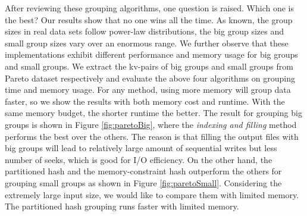After reviewing these grouping algorithms, one question is raised. Which one is the best? Our results show that no one wins all the time. As known, the group sizes in real data sets follow power-law distributions, the big group sizes and small group sizes vary over an enormous range. We further observe that these implementations exhibit different performance and memory usage for big groups and small groups. We extract the kv-pairs of big groups and small groups from Pareto dataset respectively and evaluate the above four algorithms on grouping time and memory usage. For any method, using more memory will group data faster, so we show the results with both memory cost and runtime. With the same memory budget, the shorter runtime the better. The result for grouping big groups is shown in Figure \ref{fig:paretoBig}, where the \emph{indexing and filling} method performs the best over the others. The reason is that filling the output files with big groups will lead to relatively large amount of sequential writes but less number of seeks, which is good for I/O efficiency. On the other hand, the partitioned hash and the memory-constraint hash outperform the others for grouping small groups as shown in Figure \ref{fig:paretoSmall}. Considering the extremely large input size, we would like to compare them with limited memory. The partitioned hash grouping runs faster with limited memory.






